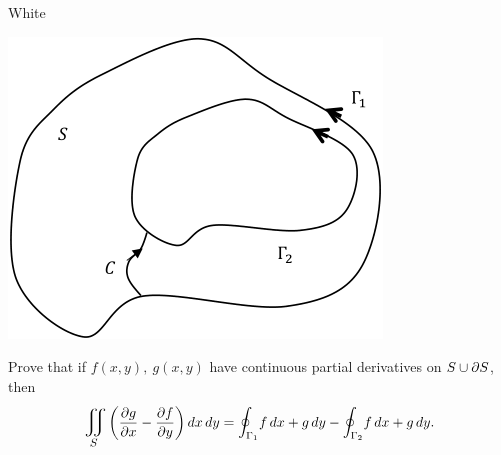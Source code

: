 \documentclass[titlepage]{article}
\begin{document}
\begin{cproblem}{4}{White}\ \\
\vspace{-1em}
\begin{center} \includegraphics[scale=.40]{coolerblob}\end{center}
Prove that if $f(x,y), \ g(x,y)$ have continuous partial derivatives on $S\cup \partial S$, then 
$$\bigiint{S}{} \left( \frac{\p g}{\p x} - \frac{\p f}{\p y} \right)dx\,dy = \mathlarger\oint_{\Gamma_1}f\,dx + g\,dy - \mathlarger\oint_{\Gamma_2}f\,dx + g\,dy.$$
\end{cproblem}
\end{document}
